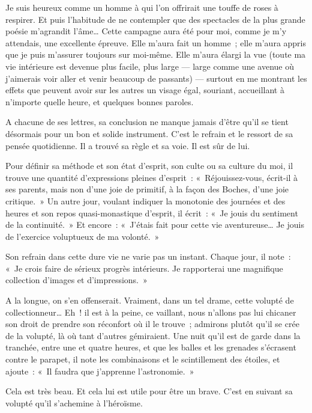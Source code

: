 \documentclass[french,twoside]{book} %
\newenvironment{quoteblock}%
  {\begin{quoting}}
  {\end{quoting}}
\newenvironment{quotebar}{%
    \def\FrameCommand{{\color{rubric!10!}\vrule width 0.5em} \hspace{0.9em}}%
    \def\OuterFrameSep{\itemsep} %
    \MakeFramed {\advance\hsize-\width \FrameRestore}
  }%
  {%
    \endMakeFramed
  }
\renewenvironment{quoteblock}%
  {%
    \savenotes
    \setstretch{0.9}
    \normalfont
    \begin{quotebar}
  }
  {%
    \end{quotebar}
    \spewnotes
  }
\begin{document}
\begin{quoteblock}
 \noindent Je suis heureux comme un homme à qui l’on offrirait une touffe de roses à respirer. Et puis l’habitude de ne contempler que des spectacles de la plus grande poésie m’agrandit l’âme… Cette campagne aura été pour moi, comme je m’y attendais, une excellente épreuve. Elle m’aura fait un homme ; elle m’aura appris que je puis m’assurer toujours sur moi-même. Elle m’aura élargi la vue (toute ma vie intérieure est devenue plus facile, plus large — large comme une avenue où j’aimerais voir aller et venir beaucoup de passants) — surtout en me montrant les effets que peuvent avoir sur les autres un visage égal, souriant, accueillant à n’importe quelle heure, et quelques bonnes paroles.‌
 \end{quoteblock}

\noindent A chacune de ses lettres, sa conclusion ne manque jamais d’être qu’il se tient désormais pour un bon et solide instrument. C’est le refrain et le ressort de sa pensée quotidienne. Il a trouvé sa règle et sa voie. Il est sûr de lui.‌\par
Pour définir sa méthode et son état d’esprit, son culte ou sa culture du moi, il trouve une quantité d’expressions pleines d’esprit : « Réjouissez-vous, écrit-il à ses parents, mais non d’une joie de primitif, à la façon des Boches, d’une joie critique. » Un autre jour, voulant indiquer la monotonie des journées et des heures et son repos quasi-monastique d’esprit, il écrit : « Je jouis du sentiment de la continuité. » Et encore : « J’étais fait pour cette vie aventureuse… Je jouis de l’exercice voluptueux de ma volonté. »‌\par
Son refrain dans cette dure vie ne varie pas un instant. Chaque jour, il note : « Je crois faire de sérieux progrès intérieurs. Je rapporterai une magnifique collection d’images et d’impressions. »‌\par
A la longue, on s’en offenserait. Vraiment, dans un tel drame, cette volupté de collectionneur… Eh ! il est à la peine, ce vaillant, nous n’allons pas lui chicaner son droit de prendre son réconfort où il le trouve ; admirons plutôt qu’il se crée de la volupté, là où tant d’autres gémiraient. Une nuit qu’il est de garde dans la tranchée, entre une et quatre heures, et que les balles et les grenades s’écrasent contre le parapet, il note les combinaisons et le scintillement des étoiles, et ajoute : « Il faudra que j’apprenne l’astronomie. »‌\par
Cela est très beau. Et cela lui est utile pour être un brave. C’est en suivant sa volupté qu’il s’achemine à l’héroïsme.‌\par
\end{document}
